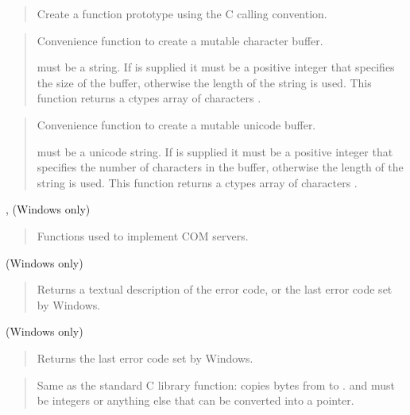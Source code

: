 \begin{quote}

Create a function prototype using the C calling convention.
\end{quote}

\begin{quote}

Convenience function to create a mutable character buffer.

 must be a string.  If  is supplied it must be a
positive integer that specifies the size of the buffer, otherwise
the length of the  string is used.
This function returns a ctypes array of characters .
\end{quote}

\begin{quote}

Convenience function to create a mutable unicode buffer.

 must be a unicode string.  If  is supplied it
must be a positive integer that specifies the number of characters
in the buffer, otherwise the length of the  string is
used.  This function returns a ctypes array of characters .
\end{quote}

,  (Windows only)
\begin{quote}

Functions used to implement COM servers.
\end{quote}

 (Windows only)
\begin{quote}

Returns a textual description of the error code, or the last error
code set by Windows.
\end{quote}

 (Windows only)
\begin{quote}

Returns the last error code set by Windows.
\end{quote}

\begin{quote}

Same as the standard C  library function: copies
 bytes from  to .   and  must
be integers or anything else that can be converted into a pointer.
\end{quote}

